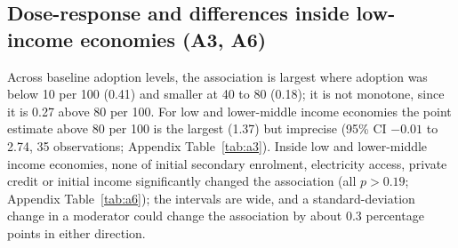 \subsection{Dose-response and differences inside low-income economies (A3, A6)}
Across baseline adoption levels, the association is largest where adoption was below 10 per 100 (0.41) and smaller at 40 to 80 (0.18); it is not monotone, since it is 0.27 above 80 per 100. For low and lower-middle income economies the point estimate above 80 per 100 is the largest (1.37) but imprecise (95\% CI $-0.01$ to 2.74, 35 observations; Appendix Table~\ref{tab:a3}). Inside low and lower-middle income economies, none of initial secondary enrolment, electricity access, private credit or initial income significantly changed the association (all $p>0.19$; Appendix Table~\ref{tab:a6}); the intervals are wide, and a standard-deviation change in a moderator could change the association by about 0.3 percentage points in either direction.


